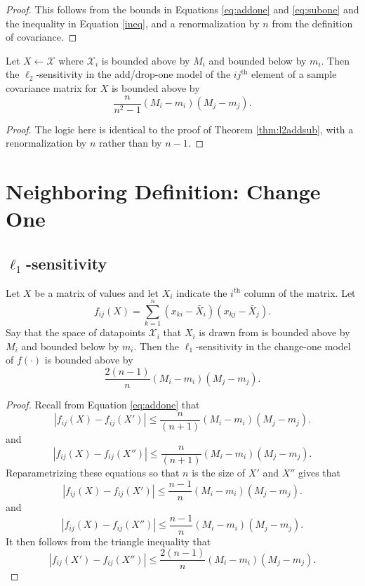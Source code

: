 \documentclass[11pt]{scrartcl} %
\begin{document}
\begin{proof}
This follows from the bounds in Equations \ref{eq:addone} and \ref{eq:subone} and the inequality in Equation \ref{ineq}, and a renormalization by $n$ from the definition of covariance.
\end{proof}

\begin{corollary}
\label{thm:l2addsub}
Let $X \leftarrow \mathcal{X}$ where $\mathcal{X}_i$ is bounded above by $M_i$ and bounded below by $m_i$. Then the $\ell_2$-sensitivity in the add/drop-one model of the $ij^{\text{th}}$ element of a sample covariance matrix for $X$ is bounded above by
$$\frac{n}{n^2-1}(M_i - m_i)(M_j - m_j).$$
\end{corollary}

\begin{proof}
The logic here is identical to the proof of Theorem \ref{thm:l2addsub}, with a renormalization by $n$ rather than by $n-1$.
\end{proof}

\section{Neighboring Definition: Change One}
\subsection{$\ell_1$-sensitivity}

\begin{theorem}
\label{thm:l1change1}
Let $X$ be a matrix of values and let $X_i$ indicate the $i^{\text{th}}$ column of the matrix. Let
$$ f_{ij} (X)= \sum_{k=1}^n (x_{ki} - \bar{X}_i)(x_{kj} - \bar{X}_j).$$
Say that the space of datapoints $\mathcal{X}_i$ that $X_i$ is drawn from is bounded above by $M_i$ and bounded below by $m_i$. Then the $\ell_1$-sensitivity in the change-one model of $f(\cdot)$ is bounded above by
$$ \frac{2(n-1)}{n}  (M_i - m_i)(M_j - m_j).$$
\end{theorem}

\begin{proof}
Recall from Equation \ref{eq:addone} that 
$$ \left\vert f_{ij}(X) - f_{ij}(X') \right\vert \le \frac{n}{(n+1)}  (M_i - m_i)(M_j - m_j).$$
and
$$ \left\vert f_{ij}(X) - f_{ij}(X'') \right\vert \le \frac{n}{(n+1)}  (M_i - m_i)(M_j - m_j).$$
Reparametrizing these equations so that $n$ is the size of $X'$ and $X''$ gives that 
$$ \left\vert f_{ij}(X) - f_{ij}(X') \right\vert \le \frac{n-1}{n}  (M_i - m_i)(M_j - m_j).$$
and
$$ \left\vert f_{ij}(X) - f_{ij}(X'') \right\vert \le \frac{n-1}{n}  (M_i - m_i)(M_j - m_j).$$
It then follows from the triangle inequality that 
$$ \left\vert f_{ij}(X') - f_{ij}(X'') \right\vert \le \frac{2(n-1)}{n}  (M_i - m_i)(M_j - m_j).$$
\end{proof}
\end{document}

